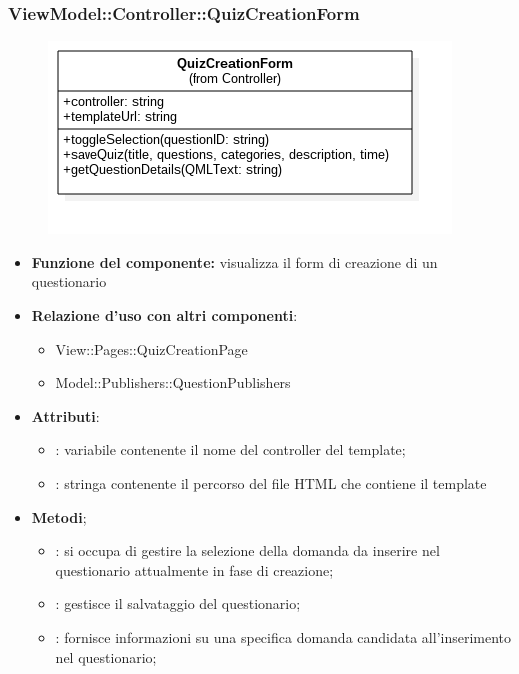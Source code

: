  \subsubsection{ViewModel::Controller::QuizCreationForm}
 \begin{figure}[h!]
\begin{center}
	\includegraphics[scale=0.6]{../images/ViewModel/Controller/QuizCreationForm.png}
\end{center}
\end{figure}
 \begin{itemize}
 \item\textbf{Funzione del componente:} visualizza il form di creazione di un questionario
 \item\textbf{Relazione d'uso con altri componenti}:
 \begin{itemize}
 	\item View::Pages::QuizCreationPage
 	\item Model::Publishers::QuestionPublishers
 \end{itemize}
 \item\textbf{Attributi}:
 	\begin{itemize}
 		\item{}: variabile contenente il nome del controller del template;\\
		
		\item{}: stringa contenente il percorso del file HTML che contiene il template\\
 	\end{itemize}
 	\item\textbf{Metodi};
 	\begin{itemize}
 		\item{}: si occupa di gestire la selezione della domanda da inserire nel questionario attualmente in fase di creazione;\\
 		\item{}:
 		gestisce il salvataggio del questionario;\\
 		\item{}: fornisce informazioni su una specifica domanda candidata all'inserimento nel questionario;\\
 	\end{itemize}
 \end{itemize}
\newpage
 
